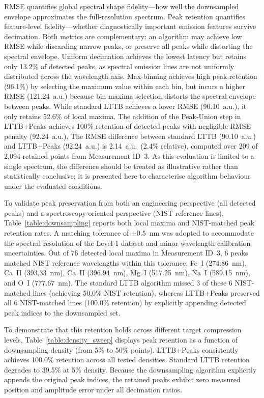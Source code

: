 \documentclass[final,5p,twocolumn,a4paper]{elsarticle}
\begin{document}
RMSE quantifies global spectral shape fidelity---how well the downsampled envelope approximates the full-resolution spectrum. Peak retention quantifies feature-level fidelity---whether diagnostically important emission features survive decimation. Both metrics are complementary: an algorithm may achieve low RMSE while discarding narrow peaks, or preserve all peaks while distorting the spectral envelope. Uniform decimation achieves the lowest latency but retains only 13.2\% of detected peaks, as spectral emission lines are not uniformly distributed across the wavelength axis. Max-binning achieves high peak retention (96.1\%) by selecting the maximum value within each bin, but incurs a higher RMSE (121.24~a.u.) because bin maxima selection distorts the spectral envelope between peaks. While standard LTTB achieves a lower RMSE (90.10~a.u.), it only retains 52.6\% of local maxima. The addition of the Peak-Union step in LTTB+Peaks achieves 100\% retention of detected peaks with negligible RMSE penalty (92.24~a.u.). The RMSE difference between standard LTTB (90.10~a.u.) and LTTB+Peaks (92.24~a.u.) is 2.14~a.u.\ (2.4\% relative), computed over 209 of 2,094 retained points from Measurement ID~3. As this evaluation is limited to a single spectrum, the difference should be treated as illustrative rather than statistically conclusive; it is presented here to characterise algorithm behaviour under the evaluated conditions.

To validate peak preservation from both an engineering perspective (all detected peaks) and a spectroscopy-oriented perspective (NIST reference lines), Table~\ref{table:downsampling} reports both local maxima and NIST-matched peak retention rates. A matching tolerance of $\pm0.5$~nm was adopted to accommodate the spectral resolution of the Level-1 dataset and minor wavelength calibration uncertainties. Out of 76 detected local maxima in Measurement ID~3, 6 peaks matched NIST reference wavelengths within this tolerance: Fe~I (274.86~nm), Ca~II (393.33~nm), Ca~II (396.94~nm), Mg~I (517.25~nm), Na~I (589.15~nm), and O~I (777.67~nm). The standard LTTB algorithm missed 3 of these 6 NIST-matched lines (achieving 50.0\% NIST retention), whereas LTTB+Peaks preserved all 6 NIST-matched lines (100.0\% retention) by explicitly appending detected peak indices to the downsampled set.

To demonstrate that this retention holds across different target compression levels, Table~\ref{table:density_sweep} displays peak retention as a function of downsampling density (from 5\% to 50\% points). LTTB+Peaks consistently achieves 100.0\% retention across all tested densities. Standard LTTB retention degrades to 39.5\% at 5\% density. Because the downsampling algorithm explicitly appends the original peak indices, the retained peaks exhibit zero measured position and amplitude error under all decimation ratios.
\end{document}
